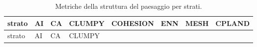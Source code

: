 \documentclass[
  a4paper,
]{book}
\begin{document}
\begin{longtable}[]{@{}
  >{\raggedright\arraybackslash}p{}
  >{\raggedleft\arraybackslash}p{}
  >{\raggedleft\arraybackslash}p{}
  >{\raggedleft\arraybackslash}p{}
  >{\raggedleft\arraybackslash}p{}
  >{\raggedleft\arraybackslash}p{}
  >{\raggedleft\arraybackslash}p{}
  >{\raggedleft\arraybackslash}p{}@{}}
\caption{\label{tab:strati} Metriche della struttura del paesaggio per strati.}\tabularnewline
\toprule\noalign{}
\begin{minipage}[b]{\linewidth}\raggedright
strato
\end{minipage} & \begin{minipage}[b]{\linewidth}\raggedleft
AI
\end{minipage} & \begin{minipage}[b]{\linewidth}\raggedleft
CA
\end{minipage} & \begin{minipage}[b]{\linewidth}\raggedleft
CLUMPY
\end{minipage} & \begin{minipage}[b]{\linewidth}\raggedleft
COHESION
\end{minipage} & \begin{minipage}[b]{\linewidth}\raggedleft
ENN
\end{minipage} & \begin{minipage}[b]{\linewidth}\raggedleft
MESH
\end{minipage} & \begin{minipage}[b]{\linewidth}\raggedleft
CPLAND
\end{minipage} \\
\midrule\noalign{}
\endfirsthead
\toprule\noalign{}
\begin{minipage}[b]{\linewidth}\raggedright
strato
\end{minipage} & \begin{minipage}[b]{\linewidth}\raggedleft
AI
\end{minipage} & \begin{minipage}[b]{\linewidth}\raggedleft
CA
\end{minipage} & \begin{minipage}[b]{\linewidth}\raggedleft
CLUMPY
\end{minipage} & \begin{minipage}[b]{\linewidth}\raggedleft

\end{minipage}
\end{longtable}
\end{document}
